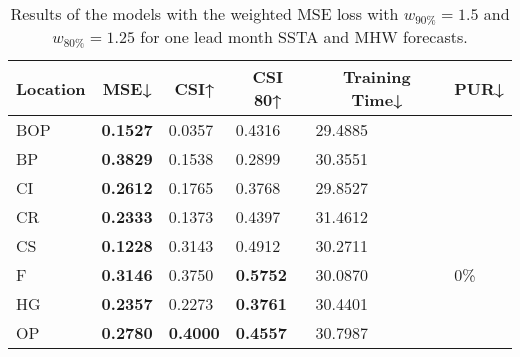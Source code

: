 \documentclass[11pt, a4paper]{article}
\begin{document}
\begin{table}[H]
\centering
\small
\caption{Results of the models with the weighted MSE loss with $w_{90\%}=1.5$ and $w_{80\%}=1.25$ for one lead month SSTA and MHW forecasts.}\label{tb:wmse}
\begin{tabular}{llllll}
\multicolumn{1}{c}{\textbf{Location}} & \multicolumn{1}{c}{\textbf{MSE↓}} & \multicolumn{1}{c}{\textbf{CSI↑}} & \multicolumn{1}{c}{\textbf{CSI 80↑}} & \multicolumn{1}{c}{\textbf{Training Time↓}} & \multicolumn{1}{c}{\textbf{PUR↓}} \\ \hline
BOP                         & \textbf{0.1527}                   & 0.0357                            & 0.4316                               & 29.4885                                     &                                   \\
BP                        & \textbf{0.3829}                   & 0.1538                            & 0.2899                               & 30.3551                                     &                                   \\
CI                        & \textbf{0.2612}                   & 0.1765                            & 0.3768                               & 29.8527                                     &                                   \\
CR                           & \textbf{0.2333}                   & 0.1373                            & 0.4397                               & 31.4612                                     &                                   \\
CS                           & \textbf{0.1228}                   & 0.3143                            & 0.4912                               & 30.2711                                     &                                   \\
F                             & \textbf{0.3146}                   & 0.3750                            & \textbf{0.5752}                      & 30.0870                                     & 0\%                               \\
HG                          & \textbf{0.2357}                   & 0.2273                            & \textbf{0.3761}                      & 30.4401                                     &                                   \\
OP                       & \textbf{0.2780}                   & \textbf{0.4000}                   & \textbf{0.4557}                      & 30.7987                                     &                                   \\

\end{tabular}
\end{table}
\end{document}
